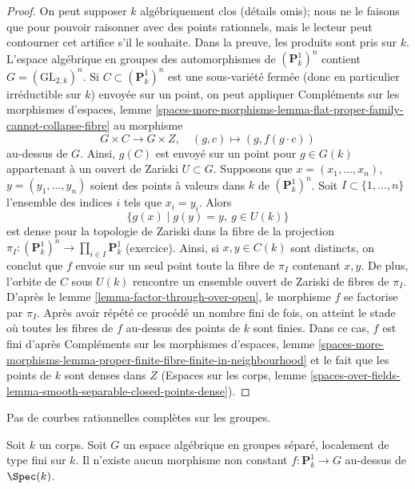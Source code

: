 \begin{proof}
On peut supposer $k$ algébriquement clos (détails omis); nous ne le faisons
que pour pouvoir raisonner avec des points rationnels, mais le lecteur peut
contourner cet artifice s'il le souhaite. Dans la preuve, les produits sont pris sur $k$.
L'espace algébrique en groupes des automorphismes de $(\mathbf{P}^1_k)^n$ contient
$G = (\text{GL}_{2, k})^n$. Si $C \subset (\mathbf{P}^1_k)^n$ est une
sous-variété fermée (donc en particulier irréductible sur $k$) envoyée
sur un point, on peut appliquer
Compléments sur les morphismes d'espaces,
lemme \ref{spaces-more-morphisms-lemma-flat-proper-family-cannot-collapse-fibre}
au morphisme
$$
G \times C \to G \times Z,\quad (g, c) \mapsto (g, f(g \cdot c))
$$
au-dessus de $G$. Ainsi, $g(C)$ est envoyé sur un point pour $g \in G(k)$
appartenant à un ouvert de Zariski $U \subset G$. Supposons que
$x = (x_1, \ldots, x_n)$, $y = (y_1, \ldots, y_n)$
soient des points à valeurs dans $k$ de $(\mathbf{P}^1_k)^n$. Soit
$I \subset \{1, \ldots, n\}$ l'ensemble des indices $i$
tels que $x_i = y_i$. Alors
$$
\{g(x) \mid g(y) = y,\ g \in U(k)\}
$$
est dense pour la topologie de Zariski dans la fibre de la projection
$\pi_I : (\mathbf{P}^1_k)^n \to \prod_{i \in I} \mathbf{P}^1_k$
(exercice). Ainsi, si $x, y \in C(k)$ sont distincts, on conclut
que $f$ envoie sur un seul point toute la fibre de $\pi_I$ contenant $x, y$.
De plus, l'orbite de $C$ sous $U(k)$ rencontre un ensemble ouvert de Zariski
de fibres de $\pi_I$. D'après le lemme \ref{lemma-factor-through-over-open},
le morphisme $f$ se factorise par $\pi_I$.
Après avoir répété ce procédé un nombre fini de fois, on atteint
le stade où toutes les fibres de $f$ au-dessus des points de $k$ sont finies.
Dans ce cas, $f$ est fini d'après
Compléments sur les morphismes d'espaces, lemme
\ref{spaces-more-morphisms-lemma-proper-finite-fibre-finite-in-neighbourhood}
et le fait que les points de $k$ sont denses dans $Z$
(Espaces sur les corps, lemme
\ref{spaces-over-fields-lemma-smooth-separable-closed-points-dense}).
\end{proof}

\begin{lemma}
\label{lemma-no-nonconstant-morphism-from-P1-to-group}
\begin{slogan}
Pas de courbes rationnelles complètes sur les groupes.
\end{slogan}
Soit $k$ un corps. Soit $G$ un espace algébrique en groupes séparé,
localement de type fini sur $k$. Il n'existe aucun
morphisme non constant $f : \mathbf{P}^1_k \to G$ au-dessus de $\Spec(k)$.
\end{lemma}

